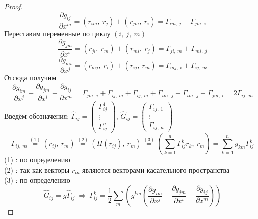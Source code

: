 \documentclass[12pt]{article}
\theoremstyle{plain}
\begin{document}
    \begin{proof}
        $$\frac{\partial g_{ij}}{\partial x^m}=(r_{im}, \ r_{j})+(r_{jm}, \ r_i)=\Gamma_{im, \ j}+\Gamma_{jm, \ i}$$
        Переставим переменные по циклу $(i, \ j, \ m)$
        $$\frac{\partial g_{jm}}{\partial x^i}=(r_{ji}, \ r_{m})+(r_{mi}, \ r_j)=\Gamma_{ji, \ m}+\Gamma_{mi, \ j}$$
        $$\frac{\partial g_{mi}}{\partial x^j}=(r_{mj}, \ r_{i})+(r_{ij}, \ r_m)=\Gamma_{mj, \ i}+\Gamma_{ij, \ m}$$
        Отсюда получим
        $$\frac{\partial g_{im}}{\partial x^j}+\frac{\partial g_{jm}}{\partial x^i}-\frac{\partial g_{ij}}{\partial x^m}=\Gamma_{jm, \ i}+\Gamma_{ij, \ m}+\Gamma_{ij, \ m}+\Gamma_{im, \ j}-\Gamma_{im, \ j}-\Gamma_{jm, \ i}=2\Gamma_{ij, \ m}$$
        Введём обозначения: $\hat{\Gamma}_{ij}=\begin{pmatrix}
            \Gamma_{ij}^1\\
            \vdots\\
            \Gamma_{ij}^n
        \end{pmatrix}$, $\hat{G}_{ij}=\begin{pmatrix}
            \Gamma_{ij, \ 1}\\
            \vdots\\
            \Gamma_{ij, \ n}
        \end{pmatrix}$
        $$\Gamma_{ij, \ m}\overset{(1)}{=}(r_{ij}, \ r_m)\overset{(2)}{=}(\Pi(r_{ij}), \ r_m)\overset{(3)}{=}\left(\sum\limits_{k=1}^n\Gamma_{ij}^kr_k, \ r_m\right)=\sum\limits_{k=1}^ng_{km}\Gamma_{ij}^k$$
        (1) : по определению\\
        (2) : так как векторы $r_m$ являются векторами касательного пространства\\
        (3) : по определению
        $$\hat{G}_{ij}=g\hat{\Gamma}_{ij} \ \Longrightarrow \ \Gamma_{ij}^k=\frac{1}{2}\sum\limits_m\left(g^{km}\left(\frac{\partial g_{im}}{\partial x^j}+\frac{\partial g_{jm}}{\partial x^i}-\frac{\partial g_{ij}}{\partial x^m}\right)\right)$$
    \end{proof}
\end{document}

